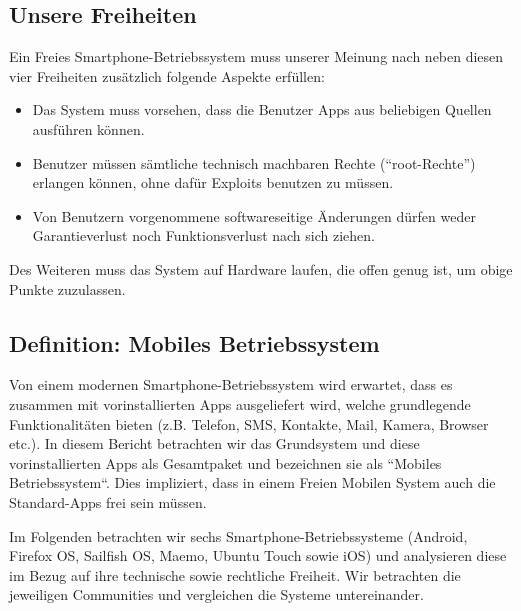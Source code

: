 \subsection{Unsere Freiheiten}
Ein Freies Smartphone-Betriebssystem muss unserer Meinung nach neben diesen vier Freiheiten zusätzlich folgende Aspekte erfüllen:
\begin{itemize}
	\renewcommand\labelitemi{--}
	\item Das System muss vorsehen, dass die Benutzer Apps aus beliebigen Quellen ausführen können.
	\item Benutzer müssen sämtliche technisch machbaren Rechte (\mbox{``root-Rechte''}) erlangen können, ohne dafür Exploits benutzen zu müssen.
	\item Von Benutzern vorgenommene softwareseitige Änderungen dürfen weder Garantieverlust noch Funktionsverlust nach sich ziehen.
\end{itemize}
Des Weiteren muss das System auf Hardware laufen, die offen genug ist, um obige Punkte zuzulassen.
\newline

\subsection{Definition: Mobiles Betriebssystem}
Von einem modernen Smartphone-Betriebssystem wird erwartet, dass es zusammen mit vorinstallierten Apps ausgeliefert wird, welche grundlegende Funktionalitäten bieten (z.B. Telefon, SMS, Kontakte, Mail, Kamera, Browser etc.). In diesem Bericht betrachten wir das Grundsystem und diese vorinstallierten Apps als Gesamtpaket und bezeichnen sie als ``Mobiles Betriebssystem“. Dies impliziert, dass in einem Freien Mobilen System auch die Standard-Apps frei sein müssen.
\newline

Im Folgenden betrachten wir sechs Smartphone-Betriebssysteme (Android, Firefox OS, Sailfish OS, Maemo, Ubuntu Touch sowie iOS) und analysieren diese im Bezug auf ihre technische sowie rechtliche Freiheit. Wir betrachten die jeweiligen Communities und vergleichen die Systeme untereinander.